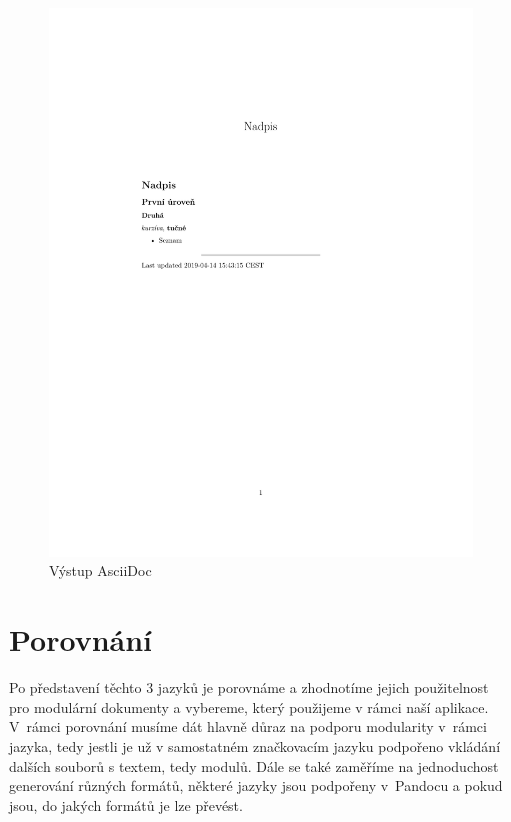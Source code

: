 \begin{figure}[h]
    \centering
    \includegraphics[width=\textwidth]{example-ascii.pdf}
    \caption{Výstup AsciiDoc}
    \label{fig:asciiOutput}
\end{figure}

\clearpage

\section{Porovnání}

Po představení těchto 3 jazyků je porovnáme a zhodnotíme jejich použitelnost pro modulární dokumenty a vybereme, který použijeme v rámci naší aplikace.
V~rámci porovnání musíme dát hlavně důraz na podporu modularity v~rámci jazyka, tedy jestli je už v samostatném značkovacím jazyku podpořeno vkládání dalších
souborů s textem, tedy modulů. Dále se také zaměříme na jednoduchost generování různých formátů, některé jazyky jsou podpořeny v~Pandocu a pokud jsou, do jakých
formátů je lze převést.


